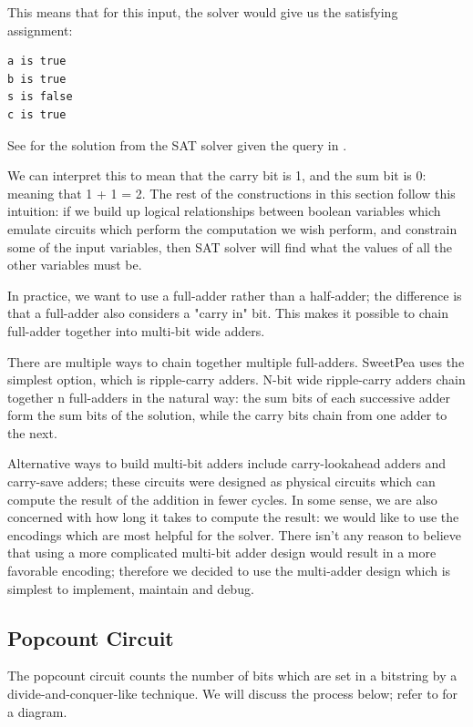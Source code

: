 This means that for this input, the solver would give us the satisfying assignment:
\begin{verbatim}
a is true
b is true
s is false
c is true
\end{verbatim}

See  for the solution from the SAT solver given the query in .

We can interpret this to mean that the carry bit is 1, and the sum bit is 0: meaning that 1 + 1 = 2. The rest of the constructions in this section follow this intuition: if we build up logical relationships between boolean variables which emulate circuits which perform the computation we wish perform, and constrain some of the input variables, then SAT solver will find what the values of all the other variables must be.

In practice, we want to use a full-adder rather than a half-adder; the difference is that a full-adder also considers a "carry in" bit. This makes it possible to chain full-adder together into multi-bit wide adders.

There are multiple ways to chain together multiple full-adders. SweetPea uses the simplest option, which is ripple-carry adders. N-bit wide ripple-carry adders chain together n full-adders in the natural way: the sum bits of each successive adder form the sum bits of the solution, while the carry bits chain from one adder to the next.

Alternative ways to build multi-bit adders include carry-lookahead adders and carry-save adders; these circuits were designed as physical circuits which can compute the result of the addition in fewer cycles. In some sense, we are also concerned with how long it takes to compute the result: we would like to use the encodings which are most helpful for the solver. There isn't any reason to believe that using a more complicated multi-bit adder design would result in a more favorable encoding; therefore we decided to use the multi-adder design which is simplest to implement, maintain and debug.

\subsection{Popcount Circuit}

The popcount circuit counts the number of bits which are set in a bitstring by a divide-and-conquer-like technique. We will discuss the process below; refer to  for a diagram.

